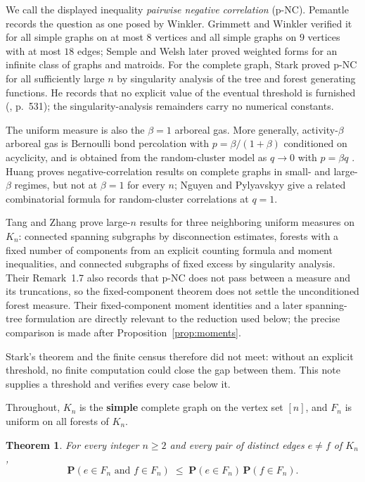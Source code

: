 \documentclass[11pt,a4paper]{amsart}
\theoremstyle{plain}
\newtheorem{theorem}{Theorem}[section]
\theoremstyle{definition}
\newcommand{\PR}{\mathbf{P}}
\begin{document}
We call the displayed inequality \emph{pairwise negative correlation} (p-NC).
Pemantle \cite{Pemantle2000} records the question as one posed by Winkler.
Grimmett and Winkler \cite{GW2004} verified it for all simple graphs on at most
$8$ vertices and all simple graphs on $9$ vertices with at most $18$ edges; Semple and
Welsh \cite{SW2008} later proved weighted forms for an infinite class of graphs
and matroids. For the complete graph, Stark \cite{Stark2011} proved p-NC for all
sufficiently large $n$ by singularity analysis \cite{FS2009} of the tree and
forest generating functions. He records that no explicit value of the eventual
threshold is furnished (\cite{Stark2011}, p.~531); the singularity-analysis
remainders carry no numerical constants.

The uniform measure is also the $\beta=1$ arboreal gas. More generally,
activity-$\beta$ arboreal gas is Bernoulli bond percolation with
$p=\beta/(1+\beta)$ conditioned on acyclicity, and is obtained from the
random-cluster model as $q\to0$ with $p=\beta q$ \cite{BCHS2021}. Huang
\cite{Huang2024} proves
negative-correlation results on complete graphs in small- and large-$\beta$
regimes, but not at $\beta=1$ for every $n$; Nguyen and Pylyavskyy
\cite{NP2025} give a related combinatorial formula for random-cluster
correlations at $q=1$.

Tang and Zhang \cite{TZ2026a} prove large-$n$ results for three neighboring
uniform measures on $K_n$: connected spanning subgraphs by disconnection
estimates, forests with a fixed number of components from an explicit counting
formula and moment inequalities, and connected subgraphs of fixed excess by
singularity analysis. Their Remark~1.7 also records that p-NC does not pass
between a measure and its truncations, so the fixed-component theorem does not
settle the unconditioned forest measure. Their fixed-component moment identities
and a later spanning-tree formulation \cite{TZ2026b} are directly relevant to
the reduction used below; the precise comparison is made after
Proposition~\ref{prop:moments}.

Stark's theorem and the finite census therefore did not meet: without an
explicit threshold, no finite computation could close the gap between them.
This note supplies a threshold and verifies every case below it.

Throughout, $K_n$ is the \textbf{simple} complete graph on the vertex set $[n]$,
and $F_n$ is uniform on all forests of $K_n$.

\begin{theorem}\label{thm:main}
For every integer $n \ge 2$ and every pair of distinct edges $e \ne f$ of $K_n$,
\[
  \PR(e \in F_n \text{ and } f \in F_n)
  \;\le\; \PR(e \in F_n)\,\PR(f \in F_n).
\]
\end{theorem}
\end{document}

